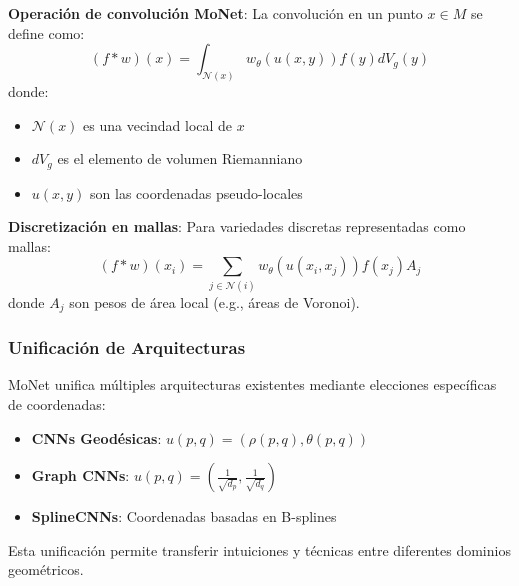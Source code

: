 \textbf{Operación de convolución MoNet}: La convolución en un punto $x \in M$ se define como:
\begin{equation}
(f * w)(x) = \int_{\mathcal{N}(x)} w_\theta(u(x, y)) f(y) dV_g(y)
\end{equation}
donde:
\begin{itemize}
    \item $\mathcal{N}(x)$ es una vecindad local de $x$
    \item $dV_g$ es el elemento de volumen Riemanniano
    \item $u(x, y)$ son las coordenadas pseudo-locales
\end{itemize}

\textbf{Discretización en mallas}: Para variedades discretas representadas como mallas:
\begin{equation}
(f * w)(x_i) = \sum_{j \in \mathcal{N}(i)} w_\theta(u(x_i, x_j)) f(x_j) A_j
\end{equation}
donde $A_j$ son pesos de área local (e.g., áreas de Voronoi).

\subsubsection{Unificación de Arquitecturas}

MoNet unifica múltiples arquitecturas existentes mediante elecciones específicas de coordenadas:

\begin{itemize}
    \item \textbf{CNNs Geodésicas}: $u(p,q) = (\rho(p,q), \theta(p,q))$
    \item \textbf{Graph CNNs}: $u(p,q) = (\frac{1}{\sqrt{d_p}}, \frac{1}{\sqrt{d_q}})$
    \item \textbf{SplineCNNs}: Coordenadas basadas en B-splines
\end{itemize}

Esta unificación permite transferir intuiciones y técnicas entre diferentes dominios geométricos.

